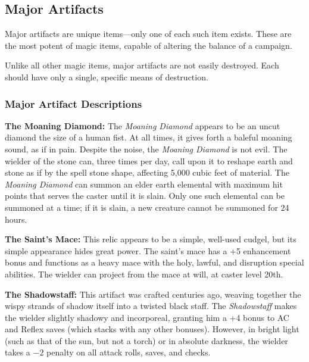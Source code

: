 \subsection{Major Artifacts}
Major artifacts are unique items—only one of each such item exists. These are the most potent of magic items, capable of altering the balance of a campaign.

Unlike all other magic items, major artifacts are not easily destroyed. Each should have only a single, specific means of destruction.

\subsubsection{Major Artifact Descriptions}

\textbf{The Moaning Diamond:} The \emph{Moaning Diamond} appears to be an uncut diamond the size of a human fist. At all times, it gives forth a baleful moaning sound, as if in pain. Despite the noise, the \emph{Moaning Diamond} is not evil. The wielder of the stone can, three times per day, call upon it to reshape earth and stone as if by the spell stone shape, affecting 5,000 cubic feet of material. The \emph{Moaning Diamond} can summon an elder earth elemental with maximum hit points that serves the caster until it is slain. Only one such elemental can be summoned at a time; if it is slain, a new creature cannot be summoned for 24 hours.

\textbf{The Saint's Mace:} This relic appears to be a simple, well-used cudgel, but its simple appearance hides great power. The saint's mace has a +5 enhancement bonus and functions as a heavy mace with the holy, lawful, and disruption special abilities. The wielder can project  from the mace at will, at caster level 20th.

\textbf{The Shadowstaff:} This artifact was crafted centuries ago, weaving together the wispy strands of shadow itself into a twisted black staff. The \emph{Shadowstaff} makes the wielder slightly shadowy and incorporeal, granting him a +4 bonus to AC and Reflex saves (which stacks with any other bonuses). However, in bright light (such as that of the sun, but not a torch) or in absolute darkness, the wielder takes a $-2$ penalty on all attack rolls, saves, and checks.

